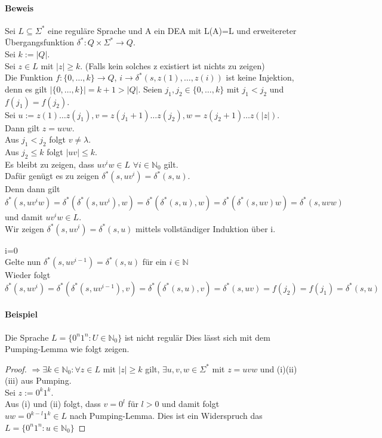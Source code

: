     \paragraph*{Beweis}
        Sei \(L\subseteq\Sigma^*\) eine reguläre Sprache und A ein DEA mit L(A)=L und erweitereter Übergangsfunktion \(\delta^*:Q\times\Sigma^*\to Q\).\\
        Sei \(k:=|Q|\).\\
        Sei \(z\in L\) mit \(|z|\geq k\). (Falls kein solches z existiert ist nichts zu zeigen)\\
        Die Funktion \(f:\{0,\dots,k\}\to Q\), \(i\to \delta^*(s,z(1),\dots,z(i))\) ist keine Injektion, denn es gilt \(|\{0,\dots,k\}|=k+1>|Q|\). Seien \(j_1,j_2\in\{0,\dots,k\}\) mit \(j_1<j_2\) und \(f(j_1)=f(j_2)\).\\
        Sei \(u:=z(1)\dots z(j_1),v=z(j_1+1)\dots z(j_2),w=z(j_2+1)\dots z(|z|)\).\\
        Dann gilt \(z=uvw\).\\
        Aus \(j_1<j_2\) folgt \(v\not=\lambda\).\\
        Aus \(j_2\leq k\) folgt \(|uv|\leq k\).\\
        Es bleibt zu zeigen, dass \(uv^iw\in L\) \(\forall i\in\mathbb{N}_0\) gilt.\\
        Dafür genügt es zu zeigen \(\delta^*(s,uv^i)=\delta^*(s,u)\).\\
        Denn dann gilt\\
        \[\delta^*(s,uv^iw)=\delta^*(\delta^*(s,uv^i),w)=\delta^*(\delta^*(s,u),w)=\delta^*(\delta^*(s,uv)w)=\delta^*(s,uvw)\] und damit \(uv^iw\in L\).\\
        Wir zeigen \(\delta^*(s,uv^i)=\delta^*(s,u)\) mittels vollständiger Induktion über i.\par\bigskip 
        i=0\\
        Gelte nun \(\delta^*(s,uv^{i-1})=\delta^*(s,u)\) für ein \(i\in\mathbb{N}\)\\
        Wieder folgt \[\delta^*(s,uv^i)=\delta^*(\delta^*(s,uv^{i-1}),v)=\delta^*(\delta^*(s,u),v)=\delta^*(s,uv)=f(j_2)=f(j_1)=\delta^*(s,u)\]
    \paragraph*{Beispiel}
    Die Sprache \(L=\{0^n1^n:U\in\mathbb{N}_0\}\) ist nicht regulär Dies lässt sich mit dem Pumping-Lemma wie folgt zeigen.
    \begin{proof}
        \(\Rightarrow\exists k\in\mathbb{N}_0:\forall z\in L\) mit \(|z|\geq k\) gilt, \(\exists u,v,w\in\Sigma^*\) mit \(z=uvw\) und (i)(ii)(iii) aus Pumping.\\
        Sei \(z:=0^k1^k\).\\
        Aus (i) und (ii) folgt, dass \(v=0^l\) für \(l>0\) und damit folgt\\
        \(uw=0^{k-l}1^k\in L\) nach Pumping-Lemma. Dies ist ein Widerspruch das \(L=\{0^n1^n:u\in\mathbb{N}_0\}\)
    \end{proof}